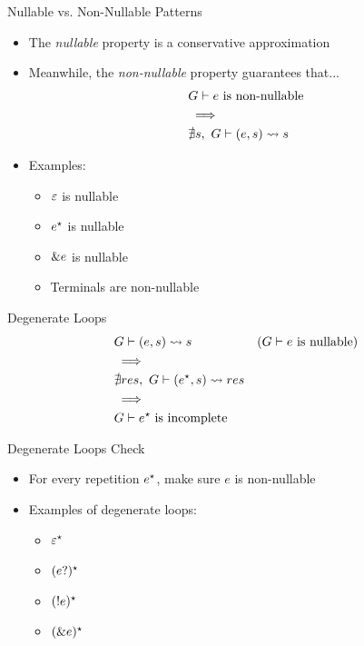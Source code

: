 \documentclass{beamer}
\begin{document}
\begin{frame}{Nullable vs. Non-Nullable Patterns}
    \begin{itemize}
        \item The \emph{nullable} property is a conservative approximation
        \item Meanwhile, the \emph{non-nullable} property guarantees that...
        \begin{align*}
            & \text{$G \vdash e$ is non-nullable} \\
            & \implies \\
            & \nexists s,\ G \vdash (e, s) \rightsquigarrow s
        \end{align*}
        \item Examples:
        \begin{itemize}
            \item $\varepsilon$ is nullable
            \item $e^\star$ is nullable
            \item $\&e$ is nullable
            \item Terminals are non-nullable
        \end{itemize}
    \end{itemize}
\end{frame}

\begin{frame}{Degenerate Loops}
    \begin{align*}
        & G \vdash (e, s) \rightsquigarrow s & \text{($G \vdash e$ is nullable)} \\
        & \implies \\
        & \nexists res,\ G \vdash (e^\star, s) \rightsquigarrow res \\
        & \implies \\
        & \text{$G \vdash e^\star$ is incomplete}
    \end{align*}
\end{frame}

\begin{frame}{Degenerate Loops Check}
    \begin{itemize}
        \item For every repetition $e^\star$, make sure $e$ is non-nullable
    \end{itemize}
    \begin{itemize}
        \item Examples of degenerate loops:
        \begin{itemize}
            \item $\varepsilon^\star$
            \item $(e?)^\star$
            \item $(!e)^\star$
            \item $(\&e)^\star$
        \end{itemize}
    \end{itemize}
\end{frame}
\end{document}
